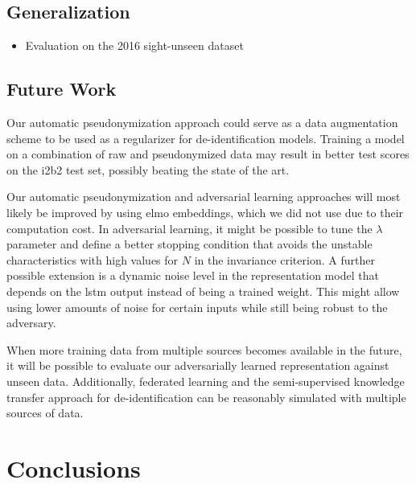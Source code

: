 \subsection{Generalization}

\begin{itemize}
    \item Evaluation on the 2016 sight-unseen dataset
\end{itemize}

\subsection{Future Work}
%
Our automatic pseudonymization approach could serve as a data augmentation scheme to be used as a regularizer for de-identification models.
%
Training a model on a combination of raw and pseudonymized data may result in better test scores on the i2b2 test set, possibly beating the state of the art.

%
Our automatic pseudonymization and adversarial learning approaches will most likely be improved by using \ac{elmo} embeddings, which we did not use due to their computation cost.
%
In adversarial learning, it might be possible to tune the $\lambda$ parameter and define a better stopping condition that avoids the unstable characteristics with high values for $N$ in the invariance criterion.
%
A further possible extension is a dynamic noise level in the representation model that depends on the \ac{lstm} output instead of being a trained weight.
%
This might allow using lower amounts of noise for certain inputs while still being robust to the adversary.

%
When more training data from multiple sources becomes available in the future, it will be possible to evaluate our adversarially learned representation against unseen data.
%
Additionally, federated learning and the semi-supervised knowledge transfer approach for de-identification can be reasonably simulated with multiple sources of data.


\section{Conclusions}\label{sec:conclusions}